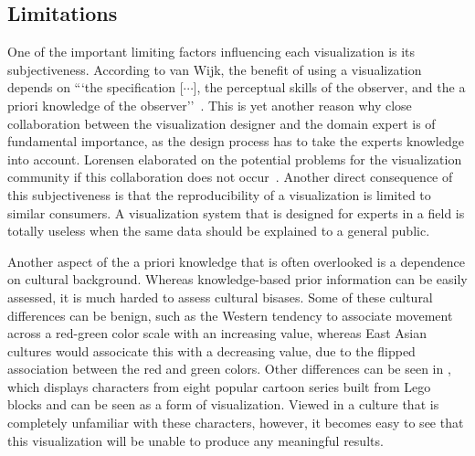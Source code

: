 \subsection{Limitations} \label{cha:intro:vis:limitations}
One of the important limiting factors influencing each visualization is its subjectiveness.  According to van Wijk, the benefit of using a visualization depends on ```the specification [$\cdots$], the perceptual skills of the observer, and the a priori knowledge of the observer''~\cite{van2005value}.  This is yet another reason why close collaboration between the visualization designer and the domain expert is of fundamental importance, as the design process has to take the experts knowledge into account.  Lorensen elaborated on the potential problems for the visualization community if this collaboration does not occur~\cite{lorensen2004death}.  Another direct consequence of this subjectiveness is that the reproducibility of a visualization is limited to similar consumers.  A visualization system that is designed for experts in a field is totally useless when the same data should be explained to a general public.  

Another aspect of the a priori knowledge that is often overlooked is a dependence on cultural background.  Whereas knowledge-based prior information can be easily assessed, it is much harded to assess cultural bisases.  Some of these cultural differences can be benign, such as the Western tendency to associate movement across a red-green color scale with an increasing value, whereas East Asian cultures would associcate this with a decreasing value, due to the flipped association between the red and green colors.  Other differences can be seen in , which displays characters from eight popular cartoon series built from Lego blocks and can be seen as a form of visualization.  Viewed in a culture that is completely unfamiliar with these characters, however, it becomes easy to see that this visualization will be unable to produce any meaningful results.

